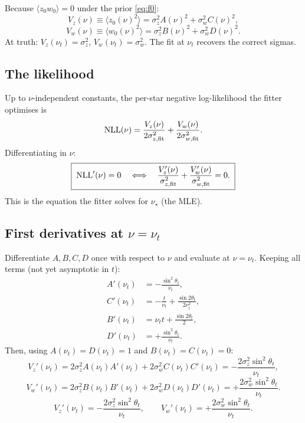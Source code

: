\documentclass[11pt]{article}
\begin{document}
Because $\langle z_0 w_0\rangle=0$ under the prior \eqref{eq:f0}:
\begin{equation}
\boxed{\;
V_z(\nu) \equiv \langle z_0(\nu)^2\rangle = \sigma_z^2 A(\nu)^2 + \sigma_w^2 C(\nu)^2,
\;}
\end{equation}
\begin{equation}
\boxed{\;
V_w(\nu) \equiv \langle w_0(\nu)^2\rangle = \sigma_z^2 B(\nu)^2 + \sigma_w^2 D(\nu)^2.
\;}
\end{equation}
At truth: $V_z(\nu_t)=\sigma_z^2$, $V_w(\nu_t)=\sigma_w^2$. The fit at $\nu_t$ recovers the
correct sigmas.

\subsection{The likelihood}

Up to $\nu$-independent constants, the per-star negative log-likelihood the fitter
optimises is
\begin{equation}
\mathrm{NLL}(\nu) = \frac{V_z(\nu)}{2\sigma_{z,\rm fit}^2}+\frac{V_w(\nu)}{2\sigma_{w,\rm fit}^2}.
\label{eq:NLL-harm}
\end{equation}
Differentiating in $\nu$:
\begin{equation}
\boxed{\;
\mathrm{NLL}'(\nu) = 0
\quad\Longleftrightarrow\quad
\frac{V_z'(\nu)}{\sigma_{z,\rm fit}^2} + \frac{V_w'(\nu)}{\sigma_{w,\rm fit}^2} = 0.
\;}
\label{eq:gradbal}
\end{equation}
This is the equation the fitter solves for $\nu_\star$ (the MLE).

\subsection{First derivatives at $\nu=\nu_t$}

Differentiate $A,B,C,D$ once with respect to $\nu$ and evaluate at $\nu=\nu_t$. Keeping
all terms (not yet asymptotic in $t$):
\begin{align}
A'(\nu_t) &= -\frac{\sin^2\theta_t}{\nu_t},\\[2pt]
C'(\nu_t) &= -\frac{t}{\nu_t} + \frac{\sin 2\theta_t}{2\nu_t^2},\\[2pt]
B'(\nu_t) &= \nu_t t + \frac{\sin 2\theta_t}{2},\\[2pt]
D'(\nu_t) &= +\frac{\sin^2\theta_t}{\nu_t}.
\end{align}
Then, using $A(\nu_t)=D(\nu_t)=1$ and $B(\nu_t)=C(\nu_t)=0$:
\begin{equation}
V_z'(\nu_t) = 2\sigma_z^2 A(\nu_t)A'(\nu_t) + 2\sigma_w^2 C(\nu_t)C'(\nu_t)
= -\frac{2\sigma_z^2\sin^2\theta_t}{\nu_t},
\end{equation}
\begin{equation}
V_w'(\nu_t) = 2\sigma_z^2 B(\nu_t)B'(\nu_t) + 2\sigma_w^2 D(\nu_t)D'(\nu_t)
= +\frac{2\sigma_w^2\sin^2\theta_t}{\nu_t}.
\end{equation}
\begin{equation}
\boxed{\;
V_z'(\nu_t) = -\frac{2\sigma_z^2\sin^2\theta_t}{\nu_t},
\qquad
V_w'(\nu_t) = +\frac{2\sigma_w^2\sin^2\theta_t}{\nu_t}.
\;}
\label{eq:firstderiv}
\end{equation}
\end{document}
